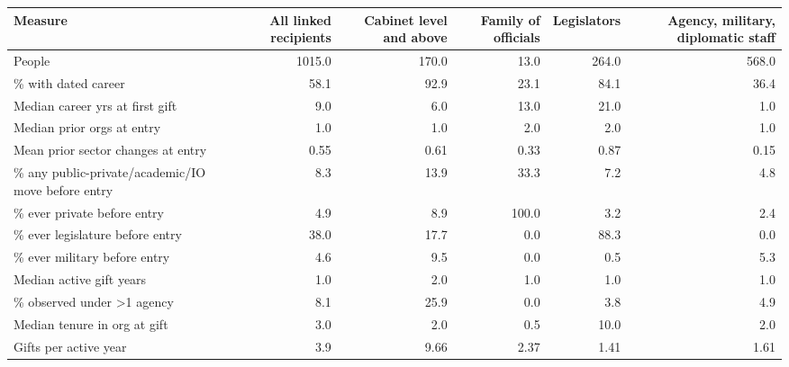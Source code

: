 \begin{tabular}{lrrrrr}
\toprule
Measure & All linked recipients & Cabinet level and above & Family of officials & Legislators & Agency, military, diplomatic staff \\
\midrule
People & 1015.0 & 170.0 & 13.0 & 264.0 & 568.0 \\
\% with dated career & 58.1 & 92.9 & 23.1 & 84.1 & 36.4 \\
Median career yrs at first gift & 9.0 & 6.0 & 13.0 & 21.0 & 1.0 \\
Median prior orgs at entry & 1.0 & 1.0 & 2.0 & 2.0 & 1.0 \\
Mean prior sector changes at entry & 0.55 & 0.61 & 0.33 & 0.87 & 0.15 \\
\% any public-private/academic/IO move before entry & 8.3 & 13.9 & 33.3 & 7.2 & 4.8 \\
\% ever private before entry & 4.9 & 8.9 & 100.0 & 3.2 & 2.4 \\
\% ever legislature before entry & 38.0 & 17.7 & 0.0 & 88.3 & 0.0 \\
\% ever military before entry & 4.6 & 9.5 & 0.0 & 0.5 & 5.3 \\
Median active gift years & 1.0 & 2.0 & 1.0 & 1.0 & 1.0 \\
\% observed under >1 agency & 8.1 & 25.9 & 0.0 & 3.8 & 4.9 \\
Median tenure in org at gift & 3.0 & 2.0 & 0.5 & 10.0 & 2.0 \\
Gifts per active year & 3.9 & 9.66 & 2.37 & 1.41 & 1.61 \\
\bottomrule
\end{tabular}
\par{}

